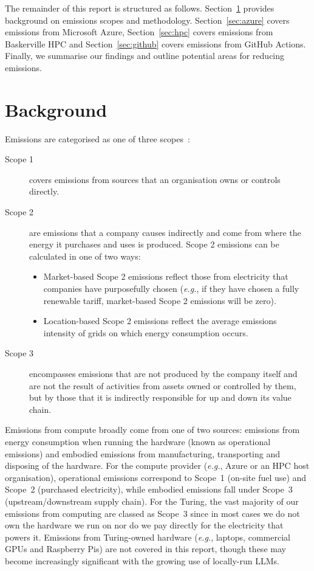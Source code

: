 \documentclass[12pt]{article}
\newcommand{\eg}{\emph{e.g.}}
\begin{document}
The remainder of this report is structured as follows. Section~\ref{sec:background} provides background on emissions scopes and methodology. Section~\ref{sec:azure} covers emissions from Microsoft Azure, Section~\ref{sec:hpc} covers emissions from Baskerville HPC and Section~\ref{sec:github} covers emissions from GitHub Actions. Finally, we summarise our findings and outline potential areas for reducing emissions.

\section{Background}
\label{sec:background}

Emissions are categorised as one of three scopes~\cite{nationalgrid}:

\begin{description}
    \item[Scope 1] covers emissions from sources that an organisation owns or controls directly.
    \item[Scope 2] are emissions that a company causes indirectly and come from where the energy it purchases and uses is produced. Scope 2 emissions can be calculated in one of two ways:
    \begin{itemize}
        \item Market-based Scope 2 emissions reflect those from electricity that companies have purposefully chosen (\eg, if they have chosen a fully renewable tariff, market-based Scope 2 emissions will be zero).
        \item Location-based Scope 2 emissions reflect the average emissions intensity of grids on which energy consumption occurs.
    \end{itemize}
    \item[Scope 3] encompasses emissions that are not produced by the company itself and are not the result of activities from assets owned or controlled by them, but by those that it is indirectly responsible for up and down its value chain.
\end{description}

Emissions from compute broadly come from one of two sources: emissions from energy consumption when running the hardware (known as operational emissions) and embodied emissions from manufacturing, transporting and disposing of the hardware. For the compute provider (\eg, Azure or an HPC host organisation), operational emissions correspond to Scope~1 (on-site fuel use) and Scope~2 (purchased electricity), while embodied emissions fall under Scope~3 (upstream/downstream supply chain). For the Turing, the vast majority of our emissions from computing are classed as Scope~3 since in most cases we do not own the hardware we run on nor do we pay directly for the electricity that powers it. Emissions from Turing-owned hardware (\eg, laptops, commercial GPUs and Raspberry Pis) are not covered in this report, though these may become increasingly significant with the growing use of locally-run LLMs.
\end{document}
